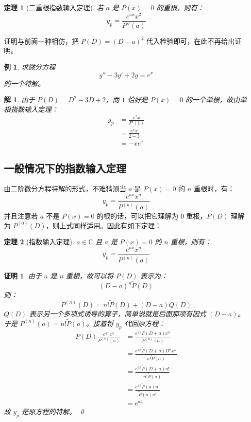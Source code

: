 \documentclass{article}
\newtheorem{thm}{定理}[section]
\newtheorem*{prf}{证明}
\newtheorem{exm}{例}[section]
\newtheorem*{sol}{解}
\begin{document}
\begin{thm}[二重根指数输入定理]
若 $a$ 是 $P(x) = 0$ 的重根，则有：
$$
y_p = \frac{e^{ax}x^2}{P''(a)}
$$
\end{thm}
\noindent 证明与前面一种相仿，把 $P(D) = (D-a)^2$ 代入检验即可，在此不再给出证明。

\begin{exm}
求微分方程
$$
y'' - 3y' + 2y = e^x
$$
的一个特解。
\end{exm}

\begin{sol}
由于 $P(D) = D^2 - 3D + 2$，而 $1$ 恰好是 $P(x) = 0$ 的一个单根，故由单根指数输入定理：
\begin{align*}
    y_p &= \frac{e^x x}{P'(1)}\\
    &= \frac{e^x x}{2 - 3}\\
    &= -xe^x
\end{align*}
\end{sol}

\subsection{一般情况下的指数输入定理}

\noindent 由二阶微分方程特解的形式，不难猜测当 $a$ 是 $P(x) = 0$ 的 $n$ 重根时，有：
$$
y_p = \frac{e^{ax}x^n}{P^{(n)}(a)}
$$
并且注意若 $a$ 不是 $P(x) = 0$ 的根的话，可以把它理解为 $0$ 重根，$P(D)$ 理解为 $P^{(0)}(D)$，则上式同样适用。因此有如下定理：

\begin{thm}[指数输入定理]
$a\in \mathbb{C}$ 且 $a$ 是 $P(x) = 0$ 的 $n$ 重根，则有：
$$
y_p = \frac{e^{ax}x^n}{P^{(n)}(a)}
$$
\end{thm}

\begin{prf}
由于 $a$ 是 $n$ 重根，故可以将 $P(D)$ 表示为：
$$
(D-a)^n\tilde{P}(D)
$$
则：
$$
P^{(n)}(D) = n!\tilde{P}(D) + (D-a)Q(D)
$$
$Q(D)$ 表示另一个多项式诱导的算子，简单说就是后面那项有因式 $(D-a)$。于是 $P^{(n)}(a) = n!\tilde{P}(a)$。接着将 $y_p$ 代回原方程：
\begin{align*}
    P(D)\frac{e^{ax}x^n}{P^{(n)}(a)} &= \frac{e^{ax}P(D+a)x^n}{P^{(n)}(a)}\\
    &= \frac{e^{ax}\tilde{P}(D+a)D^n x^n}{n!\tilde{P}(a)}\\
    &= \frac{e^{ax}\tilde{P}(D+a)n!}{n!\tilde{P}(a)}\\
    &= \frac{e^{ax}\tilde{P}(a)n!}{\tilde{P}(a)n!}\\
    &= e^{ax}
\end{align*}
故 $y_p$ 是原方程的特解。
    \qed
\end{prf}
\end{document}

